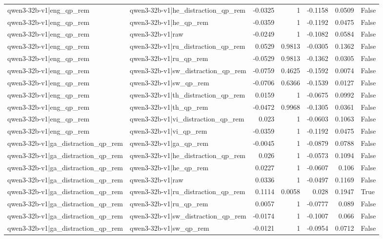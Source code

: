 \begin{table}
\begin{tabular}{l l r r r r l}
qwen3-32b-v1|eng_qp_rem & qwen3-32b-v1|he_distraction_qp_rem & -0.0325 & 1 & -0.1158 & 0.0509 & False \\
qwen3-32b-v1|eng_qp_rem & qwen3-32b-v1|he_qp_rem & -0.0359 & 1 & -0.1192 & 0.0475 & False \\
qwen3-32b-v1|eng_qp_rem & qwen3-32b-v1|raw & -0.0249 & 1 & -0.1082 & 0.0584 & False \\
qwen3-32b-v1|eng_qp_rem & qwen3-32b-v1|ru_distraction_qp_rem & 0.0529 & 0.9813 & -0.0305 & 0.1362 & False \\
qwen3-32b-v1|eng_qp_rem & qwen3-32b-v1|ru_qp_rem & -0.0529 & 0.9813 & -0.1362 & 0.0305 & False \\
qwen3-32b-v1|eng_qp_rem & qwen3-32b-v1|sw_distraction_qp_rem & -0.0759 & 0.4625 & -0.1592 & 0.0074 & False \\
qwen3-32b-v1|eng_qp_rem & qwen3-32b-v1|sw_qp_rem & -0.0706 & 0.6366 & -0.1539 & 0.0127 & False \\
qwen3-32b-v1|eng_qp_rem & qwen3-32b-v1|th_distraction_qp_rem & 0.0159 & 1 & -0.0675 & 0.0992 & False \\
qwen3-32b-v1|eng_qp_rem & qwen3-32b-v1|th_qp_rem & -0.0472 & 0.9968 & -0.1305 & 0.0361 & False \\
qwen3-32b-v1|eng_qp_rem & qwen3-32b-v1|vi_distraction_qp_rem & 0.023 & 1 & -0.0603 & 0.1063 & False \\
qwen3-32b-v1|eng_qp_rem & qwen3-32b-v1|vi_qp_rem & -0.0359 & 1 & -0.1192 & 0.0475 & False \\
qwen3-32b-v1|ga_distraction_qp_rem & qwen3-32b-v1|ga_qp_rem & -0.0045 & 1 & -0.0879 & 0.0788 & False \\
qwen3-32b-v1|ga_distraction_qp_rem & qwen3-32b-v1|he_distraction_qp_rem & 0.026 & 1 & -0.0573 & 0.1094 & False \\
qwen3-32b-v1|ga_distraction_qp_rem & qwen3-32b-v1|he_qp_rem & 0.0227 & 1 & -0.0607 & 0.106 & False \\
qwen3-32b-v1|ga_distraction_qp_rem & qwen3-32b-v1|raw & 0.0336 & 1 & -0.0497 & 0.1169 & False \\
qwen3-32b-v1|ga_distraction_qp_rem & qwen3-32b-v1|ru_distraction_qp_rem & 0.1114 & 0.0058 & 0.028 & 0.1947 & True \\
qwen3-32b-v1|ga_distraction_qp_rem & qwen3-32b-v1|ru_qp_rem & 0.0057 & 1 & -0.0777 & 0.089 & False \\
qwen3-32b-v1|ga_distraction_qp_rem & qwen3-32b-v1|sw_distraction_qp_rem & -0.0174 & 1 & -0.1007 & 0.066 & False \\
qwen3-32b-v1|ga_distraction_qp_rem & qwen3-32b-v1|sw_qp_rem & -0.0121 & 1 & -0.0954 & 0.0712 & False \\

\end{tabular}
\end{table}
